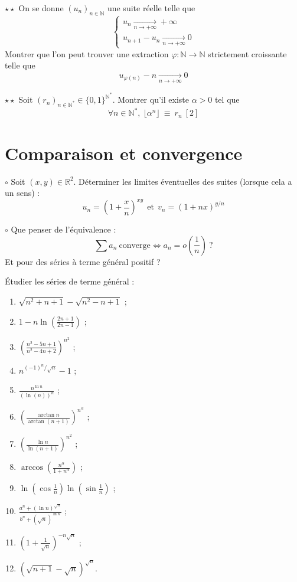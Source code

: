\documentclass[french,a4paper]{article}
\newcommand{\N}{\mathbb{N}}
\newcommand{\R}{\mathbb{R}}
\newcommand{\st}{^*}
\theoremstyle{plain}
\theoremstyle{definition}
\theoremstyle{remark}
\begin{document}
\begin{ex}[Morlot]{$\star\star$}
	On se donne $(u_n)_{n\in\N}$ une suite réelle telle que $$\begin{cases}
		u_{n}\xrightarrow[n\to+\infty]{}+\infty\\
		u_{n+1}-u_{n}\xrightarrow[n\to+\infty]{}0
	\end{cases}$$ Montrer que l'on peut trouver une extraction $\varphi:\N\to\N$ strictement croissante telle que $$u_{\varphi(n)}-n\xrightarrow[n\to+\infty]{}0$$
\end{ex}

\begin{ex}[Morlot]{$\star\star$}
	Soit $(r_n)_{n\in\N\st}\in\{0,1\}^{\N\st}$. Montrer qu'il existe $\alpha>0$ tel que $$\forall n\in\N\st,\ \lfloor\alpha^n\rfloor\ \equiv\ r_n\ [2]$$
\end{ex}

\section{Comparaison et convergence}

\begin{ex}{$\circ$}
	Soit $(x,y)\in\R^2$. Déterminer les limites éventuelles des suites (lorsque cela a un sens) : $$u_n=\left(1+\frac{x}{n}\right)^{xy}\ \ \text{et}\ \ v_n=(1+nx)^{y/n}$$
\end{ex}

\begin{ex}{$\circ$}
	Que penser de l'équivalence : $$\sum a_n\ \text{converge}\iff a_n=o\left(\frac{1}{n}\right)\ ?$$ Et pour des séries à terme général positif ?
\end{ex}

\begin{ex}{}
	Étudier les séries de terme général :
	\begin{enumerate}
		\item $\sqrt{n^2+n+1}-\sqrt{n^2-n+1}$ ;
		\item $1-\displaystyle n\ln\left(\frac{2n+1}{2n-1}\right)$ ;
		\item $\displaystyle\left(\frac{n^2-5n+1}{n^2-4n+2}\right)^{n^2}$ ;
		\item $\displaystyle n^{(-1)^n/\sqrt{n}}-1$ ;
		\item $\displaystyle\frac{n^{\ln n}}{(\ln(n))^n}$ ;
		\item $\displaystyle\left(\frac{\arctan n}{\arctan(n+1)}\right)^{n^\alpha}$ ;
		\item $\displaystyle\left(\frac{\ln n}{\ln(n+1)}\right)^{n^2}$ ;
		\item $\displaystyle\arccos\left(\frac{n^\alpha}{1+n^\alpha}\right)$ ;
		\item $\displaystyle\ln\left(\cos\frac{1}{n}\right)\ln\left(\sin\frac{1}{n}\right)$ ;
		\item $\displaystyle\frac{a^n+(\ln n)^{\sqrt{n}}}{b^n+(\sqrt{n})^{\ln n}}$ ;
		\item $\displaystyle\left(1+\frac{1}{\sqrt{n}}\right)^{-n\sqrt{n}}$ ;
		\item $\displaystyle\left(\sqrt{n+1}-\sqrt{n}\right)^{\sqrt{n}}$.
	\end{enumerate}
\end{ex}
\end{document}
